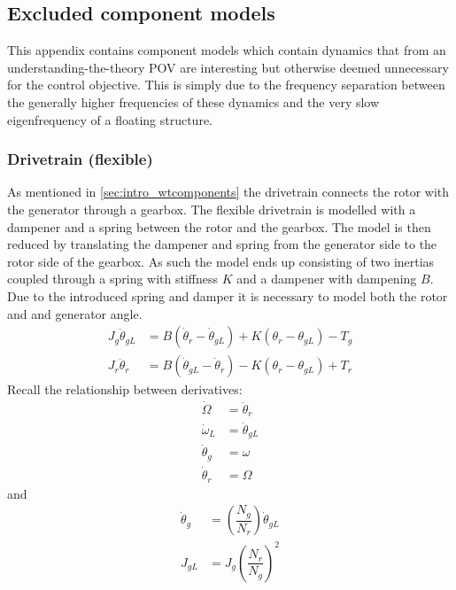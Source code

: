 \subsection{Excluded component models} \label{sec:app_excl_comp_models}
This appendix contains component models which contain dynamics that from an understanding-the-theory POV are interesting but otherwise deemed unnecessary for the control objective. This is simply due to the frequency separation between the generally higher frequencies of these dynamics and the very slow eigenfrequency of a floating structure.

\subsubsection{Drivetrain (flexible)} \label{sec:mod_drt_flex}
As mentioned in \cref{sec:intro_wtcomponents} the drivetrain connects the rotor with the generator through a gearbox. The flexible drivetrain is modelled with a dampener and a spring between the rotor and the gearbox. The model is then reduced by translating the dampener and spring from the generator side to the rotor side of the gearbox. As such the model ends up consisting of two inertias coupled through a spring with stiffness $ K $ and a dampener with dampening $ B $. Due to the introduced spring and damper it is necessary to model both the rotor and and generator angle.
\begin{align} 
	J_{g} \ddot{\theta}_{gL} & = B (\dot{\theta}_r - \dot{\theta}_{gL}) + K(\theta_r - \theta_{gL}) - T_{g} \label{eq:comp_comp_drivetrain_flex_1} \\
	J_{r} \ddot{\theta}_r & = B (\dot{\theta}_{gL} - \dot{\theta}_r ) - K(\theta_r - \theta_{gL}) + T_{r} \label{eq:comp_comp_drivetrain_flex_2}
\end{align}
Recall the relationship between derivatives:
\begin{align}
	\dot{\Omega} & = \ddot{\theta}_r \\
	\dot{\omega}_{L} & = \ddot{\theta}_{gL} \\
	\dot{\theta}_g & = \omega \\
	\dot{\theta}_r & = \Omega
\end{align}
and
\begin{align}
	\dot{\theta}_g 	&= \left(\dfrac{N_g}{N_r}\right) \dot{\theta}_{gL} \label{eq:comp_comp_drivetrain_flex_mod_3} \\
	J_{gL} 			&= J_{g} \left(\dfrac{N_r}{N_g}\right)^2 \label{eq:comp_comp_inertiamap_flex}
\end{align}
